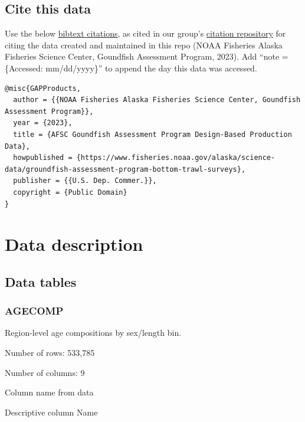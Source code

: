 \documentclass[
  letterpaper,
  oneside,
  open=any]{scrbook}
\begin{document}
\hypertarget{cite-this-data}{%
\section*{Cite this data}\label{cite-this-data}}


Use the below
\href{https://github.com/afsc-gap-products/gap_products/blob/main/code/CITATION_GAPProducts.bib}{bibtext
citations}, as cited in our group's
\href{https://github.com/afsc-gap-products/citations/blob/main/cite/bibliography.bib}{citation
repository} for citing the data created and maintained in this repo
(NOAA Fisheries Alaska Fisheries Science Center, Goundfish Assessment
Program, 2023). Add ``note = \{Accessed: mm/dd/yyyy\}'' to append the
day this data was accessed.

\begin{verbatim}
@misc{GAPProducts,
  author = {{NOAA Fisheries Alaska Fisheries Science Center, Goundfish Assessment Program}},
  year = {2023}, 
  title = {AFSC Goundfish Assessment Program Design-Based Production Data},
  howpublished = {https://www.fisheries.noaa.gov/alaska/science-data/groundfish-assessment-program-bottom-trawl-surveys},
  publisher = {{U.S. Dep. Commer.}},
  copyright = {Public Domain} 
}
\end{verbatim}

\hypertarget{data-description-1}{%
\chapter{Data description}\label{data-description-1}}

\hypertarget{data-tables}{%
\section{Data tables}\label{data-tables}}

\hypertarget{agecomp}{%
\subsection{AGECOMP}\label{agecomp}}

Region-level age compositions by sex/length bin.

Number of rows: 533,785

Number of columns: 9

Column name from data

Descriptive column Name
\end{document}
